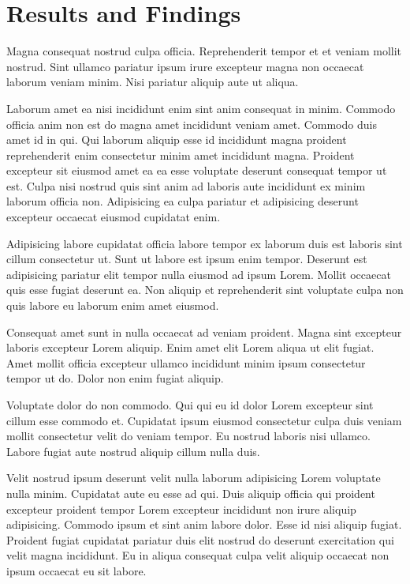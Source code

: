 \section{Results and Findings}
Magna consequat nostrud culpa officia. Reprehenderit tempor et et veniam mollit nostrud. Sint ullamco pariatur ipsum irure excepteur magna non occaecat laborum veniam minim. Nisi pariatur aliquip aute ut aliqua.

Laborum amet ea nisi incididunt enim sint anim consequat in minim. Commodo officia anim non est do magna amet incididunt veniam amet. Commodo duis amet id in qui. Qui laborum aliquip esse id incididunt magna proident reprehenderit enim consectetur minim amet incididunt magna. Proident excepteur sit eiusmod amet ea ea esse voluptate deserunt consequat tempor ut est. Culpa nisi nostrud quis sint anim ad laboris aute incididunt ex minim laborum officia non. Adipisicing ea culpa pariatur et adipisicing deserunt excepteur occaecat eiusmod cupidatat enim.

Adipisicing labore cupidatat officia labore tempor ex laborum duis est laboris sint cillum consectetur ut. Sunt ut labore est ipsum enim tempor. Deserunt est adipisicing pariatur elit tempor nulla eiusmod ad ipsum Lorem. Mollit occaecat quis esse fugiat deserunt ea. Non aliquip et reprehenderit sint voluptate culpa non quis labore eu laborum enim amet eiusmod.

Consequat amet sunt in nulla occaecat ad veniam proident. Magna sint excepteur laboris excepteur Lorem aliquip. Enim amet elit Lorem aliqua ut elit fugiat. Amet mollit officia excepteur ullamco incididunt minim ipsum consectetur tempor ut do. Dolor non enim fugiat aliquip.

Voluptate dolor do non commodo. Qui qui eu id dolor Lorem excepteur sint cillum esse commodo et. Cupidatat ipsum eiusmod consectetur culpa duis veniam mollit consectetur velit do veniam tempor. Eu nostrud laboris nisi ullamco. Labore fugiat aute nostrud aliquip cillum nulla duis.

Velit nostrud ipsum deserunt velit nulla laborum adipisicing Lorem voluptate nulla minim. Cupidatat aute eu esse ad qui. Duis aliquip officia qui proident excepteur proident tempor Lorem excepteur incididunt non irure aliquip adipisicing. Commodo ipsum et sint anim labore dolor. Esse id nisi aliquip fugiat. Proident fugiat cupidatat pariatur duis elit nostrud do deserunt exercitation qui velit magna incididunt. Eu in aliqua consequat culpa velit aliquip occaecat non ipsum occaecat eu sit labore.

